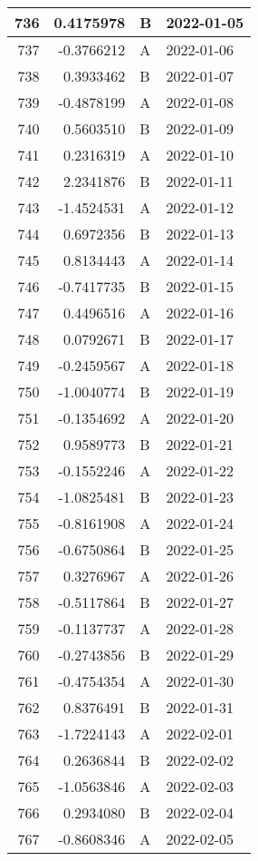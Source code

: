 \begin{tabular}{r|r|l|l}
\hline
736 & 0.4175978 & B & 2022-01-05\\
\hline
737 & -0.3766212 & A & 2022-01-06\\
\hline
738 & 0.3933462 & B & 2022-01-07\\
\hline
739 & -0.4878199 & A & 2022-01-08\\
\hline
740 & 0.5603510 & B & 2022-01-09\\
\hline
741 & 0.2316319 & A & 2022-01-10\\
\hline
742 & 2.2341876 & B & 2022-01-11\\
\hline
743 & -1.4524531 & A & 2022-01-12\\
\hline
744 & 0.6972356 & B & 2022-01-13\\
\hline
745 & 0.8134443 & A & 2022-01-14\\
\hline
746 & -0.7417735 & B & 2022-01-15\\
\hline
747 & 0.4496516 & A & 2022-01-16\\
\hline
748 & 0.0792671 & B & 2022-01-17\\
\hline
749 & -0.2459567 & A & 2022-01-18\\
\hline
750 & -1.0040774 & B & 2022-01-19\\
\hline
751 & -0.1354692 & A & 2022-01-20\\
\hline
752 & 0.9589773 & B & 2022-01-21\\
\hline
753 & -0.1552246 & A & 2022-01-22\\
\hline
754 & -1.0825481 & B & 2022-01-23\\
\hline
755 & -0.8161908 & A & 2022-01-24\\
\hline
756 & -0.6750864 & B & 2022-01-25\\
\hline
757 & 0.3276967 & A & 2022-01-26\\
\hline
758 & -0.5117864 & B & 2022-01-27\\
\hline
759 & -0.1137737 & A & 2022-01-28\\
\hline
760 & -0.2743856 & B & 2022-01-29\\
\hline
761 & -0.4754354 & A & 2022-01-30\\
\hline
762 & 0.8376491 & B & 2022-01-31\\
\hline
763 & -1.7224143 & A & 2022-02-01\\
\hline
764 & 0.2636844 & B & 2022-02-02\\
\hline
765 & -1.0563846 & A & 2022-02-03\\
\hline
766 & 0.2934080 & B & 2022-02-04\\
\hline
767 & -0.8608346 & A & 2022-02-05\\

\end{tabular}
